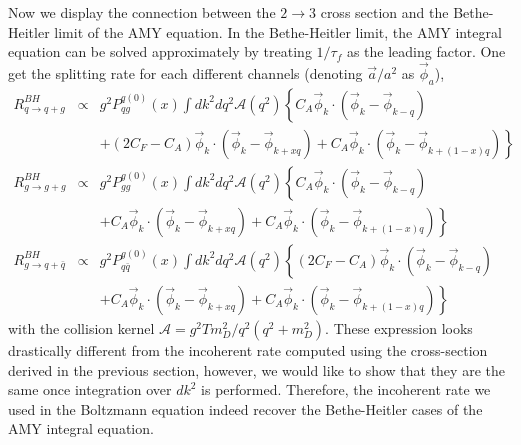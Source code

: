 Now we display the connection between the $2\rightarrow 3$ cross section and the Bethe-Heitler limit of the AMY equation.
In the Bethe-Heitler limit, the AMY integral equation can be solved approximately by treating $1/\tau_f$ as the leading factor. 
One get the splitting rate for each different channels (denoting $\vec{a}/a^2$ as $\vec{\phi}_{a}$), 
\begin{eqnarray}
R_{q\rightarrow q+g}^{BH} &\propto& g^2 P_{qg}^{q(0)}(x) \int d k^2 d q^2 \mathcal{A}(q^2) \left\{
C_A\vec{\phi}_k\cdot\left(\vec{\phi}_k-\vec{\phi}_{k-q}\right) \right.\\\nonumber
&&+\left. (2C_F-C_A) \vec{\phi}_k\cdot\left(\vec{\phi}_k-\vec{\phi}_{k+xq}\right)
+ C_A \vec{\phi}_k\cdot\left(\vec{\phi}_k - \vec{\phi}_{k+(1-x)q}\right)
\right\}
\\
R_{g\rightarrow g+g}^{BH} &\propto& g^2 P_{gg}^{g(0)}(x) \int d k^2 d q^2 \mathcal{A}(q^2) \left\{
C_A\vec{\phi}_k\cdot\left(\vec{\phi}_k-\vec{\phi}_{k-q}\right) \right.\\\nonumber
&&+\left. C_A \vec{\phi}_k\cdot\left(\vec{\phi}_k-\vec{\phi}_{k+xq}\right)
+ C_A \vec{\phi}_k\cdot\left(\vec{\phi}_k - \vec{\phi}_{k+(1-x)q}\right)
\right\}
\\
R_{g\rightarrow q+\bar{q}}^{BH} &\propto& g^2 P_{q\bar{q}}^{g(0)}(x) \int d k^2  d q^2 \mathcal{A}(q^2) \left\{
(2C_F-C_A)\vec{\phi}_k\cdot\left(\vec{\phi}_k-\vec{\phi}_{k-q}\right) \right.\\\nonumber
&&+\left. C_A \vec{\phi}_k\cdot\left(\vec{\phi}_k-\vec{\phi}_{k+xq}\right)
+ C_A \vec{\phi}_k\cdot\left(\vec{\phi}_k - \vec{\phi}_{k+(1-x)q}\right)
\right\}
\end{eqnarray}
with the collision kernel $\mathcal{A} = g^2 T m_D^2/q^2(q^2+m_D^2)$. These expression looks drastically different from the incoherent rate computed using the cross-section derived in the previous section, however, we would like to show that they are the same once integration over $dk^2$ is performed.
Therefore, the incoherent rate we used in the Boltzmann equation indeed recover the Bethe-Heitler cases of the AMY integral equation.

